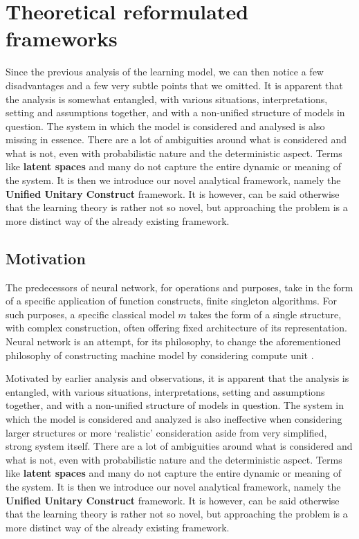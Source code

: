 \chapter{Theoretical reformulated frameworks}

Since the previous analysis of the learning model, we can then notice a few disadvantages and a few very subtle points that we omitted. It is apparent that the analysis is somewhat entangled, with various situations, interpretations, setting and assumptions together, and with a non-unified structure of models in question. The system in which the model is considered and analysed is also missing in essence. There are a lot of ambiguities around what is considered and what is not, even with probabilistic nature and the deterministic aspect. Terms like \textbf{latent spaces} and many do not capture the entire dynamic or meaning of the system. It is then we introduce our novel analytical framework, namely the \textbf{Unified Unitary Construct} framework. It is however, can be said otherwise that the learning theory is rather not so novel, but approaching the problem is a more distinct way of the already existing framework. 
\section{Motivation}
The predecessors of neural network, for operations and purposes, take in the form of a specific application of function constructs, finite singleton algorithms. For such purposes, a specific classical model $m$ takes the form of a single structure, with complex construction, often offering fixed architecture of its representation. Neural network is an attempt, for its philosophy, to change the aforementioned philosophy of constructing machine model by considering compute unit \cite{mcculloch_logical_1943,Rosenblatt1958ThePA}. 

Motivated by earlier analysis and observations, it is apparent that the analysis is entangled, with various situations, interpretations, setting and assumptions together, and with a non-unified structure of models in question. The system in which the model is considered and analyzed is also ineffective when considering larger structures or more `realistic' consideration aside from very simplified, strong system itself. There are a lot of ambiguities around what is considered and what is not, even with probabilistic nature and the deterministic aspect. Terms like \textbf{latent spaces} and many do not capture the entire dynamic or meaning of the system. It is then we introduce our novel analytical framework, namely the \textbf{Unified Unitary Construct} framework. It is however, can be said otherwise that the learning theory is rather not so novel, but approaching the problem is a more distinct way of the already existing framework. 

